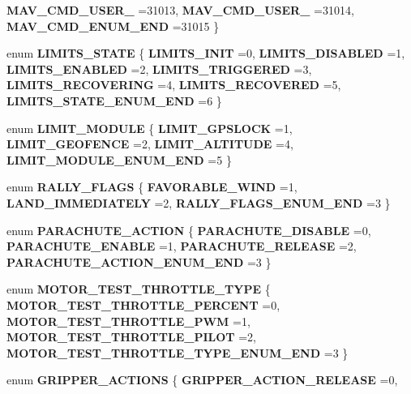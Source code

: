 \begin{DoxyCompactItemize}
\textbf{ M\+A\+V\+\_\+\+C\+M\+D\+\_\+\+U\+S\+E\+R\+\_} =31013, 
\textbf{ M\+A\+V\+\_\+\+C\+M\+D\+\_\+\+U\+S\+E\+R\+\_} =31014, 
\textbf{ M\+A\+V\+\_\+\+C\+M\+D\+\_\+\+E\+N\+U\+M\+\_\+\+E\+ND} =31015
 \}
\item 
enum \textbf{ L\+I\+M\+I\+T\+S\+\_\+\+S\+T\+A\+TE} \{ \newline
\textbf{ L\+I\+M\+I\+T\+S\+\_\+\+I\+N\+IT} =0, 
\textbf{ L\+I\+M\+I\+T\+S\+\_\+\+D\+I\+S\+A\+B\+L\+ED} =1, 
\textbf{ L\+I\+M\+I\+T\+S\+\_\+\+E\+N\+A\+B\+L\+ED} =2, 
\textbf{ L\+I\+M\+I\+T\+S\+\_\+\+T\+R\+I\+G\+G\+E\+R\+ED} =3, 
\newline
\textbf{ L\+I\+M\+I\+T\+S\+\_\+\+R\+E\+C\+O\+V\+E\+R\+I\+NG} =4, 
\textbf{ L\+I\+M\+I\+T\+S\+\_\+\+R\+E\+C\+O\+V\+E\+R\+ED} =5, 
\textbf{ L\+I\+M\+I\+T\+S\+\_\+\+S\+T\+A\+T\+E\+\_\+\+E\+N\+U\+M\+\_\+\+E\+ND} =6
 \}
\item 
enum \textbf{ L\+I\+M\+I\+T\+\_\+\+M\+O\+D\+U\+LE} \{ \textbf{ L\+I\+M\+I\+T\+\_\+\+G\+P\+S\+L\+O\+CK} =1, 
\textbf{ L\+I\+M\+I\+T\+\_\+\+G\+E\+O\+F\+E\+N\+CE} =2, 
\textbf{ L\+I\+M\+I\+T\+\_\+\+A\+L\+T\+I\+T\+U\+DE} =4, 
\textbf{ L\+I\+M\+I\+T\+\_\+\+M\+O\+D\+U\+L\+E\+\_\+\+E\+N\+U\+M\+\_\+\+E\+ND} =5
 \}
\item 
enum \textbf{ R\+A\+L\+L\+Y\+\_\+\+F\+L\+A\+GS} \{ \textbf{ F\+A\+V\+O\+R\+A\+B\+L\+E\+\_\+\+W\+I\+ND} =1, 
\textbf{ L\+A\+N\+D\+\_\+\+I\+M\+M\+E\+D\+I\+A\+T\+E\+LY} =2, 
\textbf{ R\+A\+L\+L\+Y\+\_\+\+F\+L\+A\+G\+S\+\_\+\+E\+N\+U\+M\+\_\+\+E\+ND} =3
 \}
\item 
enum \textbf{ P\+A\+R\+A\+C\+H\+U\+T\+E\+\_\+\+A\+C\+T\+I\+ON} \{ \textbf{ P\+A\+R\+A\+C\+H\+U\+T\+E\+\_\+\+D\+I\+S\+A\+B\+LE} =0, 
\textbf{ P\+A\+R\+A\+C\+H\+U\+T\+E\+\_\+\+E\+N\+A\+B\+LE} =1, 
\textbf{ P\+A\+R\+A\+C\+H\+U\+T\+E\+\_\+\+R\+E\+L\+E\+A\+SE} =2, 
\textbf{ P\+A\+R\+A\+C\+H\+U\+T\+E\+\_\+\+A\+C\+T\+I\+O\+N\+\_\+\+E\+N\+U\+M\+\_\+\+E\+ND} =3
 \}
\item 
enum \textbf{ M\+O\+T\+O\+R\+\_\+\+T\+E\+S\+T\+\_\+\+T\+H\+R\+O\+T\+T\+L\+E\+\_\+\+T\+Y\+PE} \{ \textbf{ M\+O\+T\+O\+R\+\_\+\+T\+E\+S\+T\+\_\+\+T\+H\+R\+O\+T\+T\+L\+E\+\_\+\+P\+E\+R\+C\+E\+NT} =0, 
\textbf{ M\+O\+T\+O\+R\+\_\+\+T\+E\+S\+T\+\_\+\+T\+H\+R\+O\+T\+T\+L\+E\+\_\+\+P\+WM} =1, 
\textbf{ M\+O\+T\+O\+R\+\_\+\+T\+E\+S\+T\+\_\+\+T\+H\+R\+O\+T\+T\+L\+E\+\_\+\+P\+I\+L\+OT} =2, 
\textbf{ M\+O\+T\+O\+R\+\_\+\+T\+E\+S\+T\+\_\+\+T\+H\+R\+O\+T\+T\+L\+E\+\_\+\+T\+Y\+P\+E\+\_\+\+E\+N\+U\+M\+\_\+\+E\+ND} =3
 \}
\item 
enum \textbf{ G\+R\+I\+P\+P\+E\+R\+\_\+\+A\+C\+T\+I\+O\+NS} \{ \textbf{ G\+R\+I\+P\+P\+E\+R\+\_\+\+A\+C\+T\+I\+O\+N\+\_\+\+R\+E\+L\+E\+A\+SE} =0, 

\end{DoxyCompactItemize}
